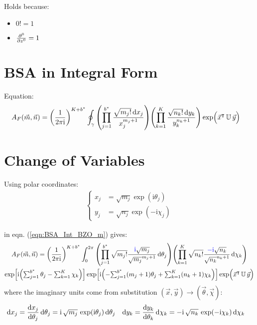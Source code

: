 \documentclass[
	english,
	a4paper,
	fontsize=10pt,
	parskip=half,
	titlepage=true,
	DIV=12,
	final
]{scrreprt}
\newcommand*{\transp}{\ensuremath{^\intercal}}
\newcommand*{\iunit}{\ensuremath{\mathrm{i}}}
\begin{document}
Holds because:
\begin{itemize}
\item $0! = 1$
\item $\pdv[0]{z} = 1$
\end{itemize}

\section{BSA in Integral Form}
Equation:
\begin{align}
	A_F(\vec{m}, \vec{n})
&=
	\qty(
		\frac{1}{2\pi\iunit}
	)^{K + b^*}
	\oint_{\gamma}
		\qty( \prod_{j=1}^{b^*}
			\frac
				{\sqrt{m_j!} \dd{x_j}}
				{x_j^{m_j+1}}
		)
		\qty( \prod_{k=1}^{K}
			\frac
				{\sqrt{n_k!} \dd{y_k}}
				{ y_k^{n_k+1} }
		)
		\exp( \Big. \vec{x}\transp \, \mathbb{U} \, \vec{y})
	\label{eqn:BSA_Int_BZO_m}
\end{align}

\section{Change of Variables}
Using polar coordinates:
\begin{align}
	\begin{cases}
	x_j &= \sqrt{m_j} \exp( \iunit \theta_j) \\
	y_j &= \sqrt{n_j} \exp(-\iunit \chi  _j)
	\end{cases}
	\label{eqn:DefXY}
\end{align}

in eqn. (\ref{eqn:BSA_Int_BZO_m}) gives:
\begin{multline}
	A_F(\vec{m}, \vec{n})
=
	\qty(
		\frac{1}{2\pi\iunit}
	)^{K + b^*}
	\int_{0}^{2\pi}
		\qty( \prod_{j=1}^{b^*}
			\sqrt{m_j!}
			\frac
				{ {\color{blue} \iunit} \sqrt{m_j}}
				{ \sqrt{m_j}^{m_j + 1} }
			\dd{\theta_j}
		)
		\qty( \prod_{k=1}^{K}
			\sqrt{n_k!}
			\frac
				{ {\color{blue} -\iunit} \sqrt{n_k}}
				{ \sqrt{n_k}^{n_k + 1} }
			\dd{\chi_k}
		)
\\
	\exp[ \iunit \qty(
		{\textstyle \sum_{j=1}^{b^*} \theta_j} - 
		{\textstyle \sum_{k=1}^{K}   \chi  _k}
	)]
	\exp[
		\iunit \qty(
			-{\textstyle \sum_{j=1}^{b^*} (m_j + 1) \theta_j}
			+{\textstyle \sum_{k=1}^{K}   (n_k + 1) \chi  _k}
	)]
	\exp( \Big. \vec{x}\transp \, \mathbb{U} \, \vec{y})
\end{multline}
where the imaginary units come from substitution $(\vec{x}, \vec{y}) \to (\vec{\theta}, \vec{\chi})$:
\begin{align}
	\dd{x_j}
&=
	\dv{x_j}{\theta_j} \dd{\theta_j}
=
	\iunit \, \sqrt{m_j} \, \exp(\iunit \theta_j) \dd{\theta_j}
&
	\dd{y_k}
&=
	\dv{y_k}{\theta_k} \dd{\chi_k}
=
	-\iunit \, \sqrt{n_k} \, \exp(-\iunit \chi_k) \dd{\chi_k}
\end{align}
\end{document}
